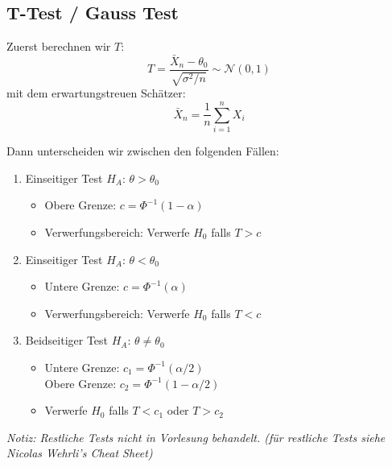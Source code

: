 \subsection{T-Test / Gauss Test}
	
Zuerst berechnen wir $T$:
$$
T = \frac{\bar{X}_n - \theta_0}{\sqrt{\sigma^2 / n}} \sim \mathcal{N}(0,1)
$$
mit dem erwartungstreuen Schätzer:
$$
\bar{X}_n = \frac{1}{n} \sum_{i=1}^n X_i
$$

Dann unterscheiden wir zwischen den folgenden Fällen:

\begin{enumerate}
    \item Einseitiger Test $H_A$: $\theta > \theta_0$
    \begin{itemize}
        \item Obere Grenze: \(c = \Phi^{-1}(1 - \alpha)\)
        \item Verwerfungsbereich: Verwerfe \(H_0\) falls \(T > c\)
    \end{itemize}
    
    \item Einseitiger Test $H_A$: $\theta < \theta_0$
    \begin{itemize}
        \item Untere Grenze: \(c = \Phi^{-1}(\alpha)\)
        \item Verwerfungsbereich: Verwerfe \(H_0\) falls \(T < c\)
    \end{itemize}
    
    \item Beidseitiger Test $H_A$: $\theta \neq \theta_0$
    \begin{itemize}
        \item Untere Grenze: \(c_1 = \Phi^{-1}(\alpha / 2)\)\\
            Obere Grenze: \(c_2 = \Phi^{-1}(1 - \alpha / 2)\)
        \item  Verwerfe \(H_0\) falls \(T < c_1\) oder \(T > c_2\)
    \end{itemize}
\end{enumerate}
\textit{Notiz: Restliche Tests nicht in Vorlesung behandelt. (für restliche Tests siehe Nicolas Wehrli's Cheat Sheet)}